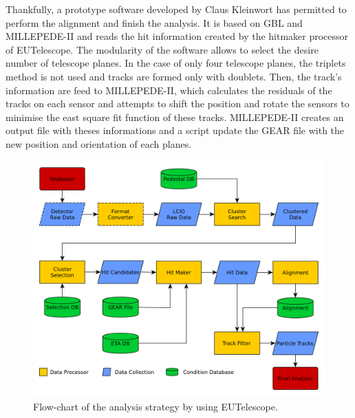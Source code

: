     Thankfully, a prototype software developed by Claus Kleinwort has permitted to perform the alignment and finish the analysis. 
    It is based on \gls{GBL} and MILLEPEDE-II and reads the hit information created by the hitmaker processor of EUTelescope. 
    The modularity of the software allows to select the desire number of telescope planes.
    In the case of only four telescope planes, the triplets method is not used and tracks are formed only with doublets.
    Then, the track's information are feed to MILLEPEDE-II, which calculates the residuals of the tracks on each sensor and attempts to shift the position and rotate the sensors to minimise the east square fit function of these tracks.
    MILLEPEDE-II creates an output file with theses informations and a script update the GEAR file with the new position and orientation of each planes.


    
    \begin{figure}[!h]
      \centering
      \includegraphics[width = \textwidth]{Pictures/X0/eutel-strategy.png}
      \caption{Flow-chart of the analysis strategy by using EUTelescope.}
      \label{fig:eutel-strategy}
    \end{figure}

